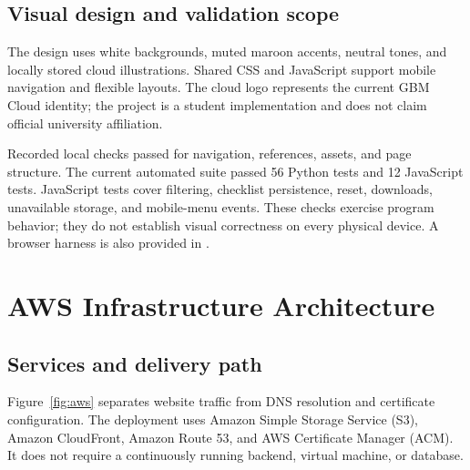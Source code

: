 \documentclass[11pt]{article}
\begin{document}
\subsection{Visual design and validation scope}
The design uses white backgrounds, muted maroon accents, neutral tones, and locally stored cloud illustrations. Shared CSS and JavaScript support mobile navigation and flexible layouts. The cloud logo represents the current GBM Cloud identity; the project is a student implementation and does not claim official university affiliation.

Recorded local checks passed for navigation, references, assets, and page structure. The current automated suite passed 56 Python tests and 12 JavaScript tests. JavaScript tests cover filtering, checklist persistence, reset, downloads, unavailable storage, and mobile-menu events. These checks exercise program behavior; they do not establish visual correctness on every physical device. A browser harness is also provided in .

\section{AWS Infrastructure Architecture}
\subsection{Services and delivery path}
Figure~\ref{fig:aws} separates website traffic from DNS resolution and certificate configuration. The deployment uses Amazon Simple Storage Service (S3), Amazon CloudFront, Amazon Route 53, and AWS Certificate Manager (ACM). It does not require a continuously running backend, virtual machine, or database.
\end{document}
